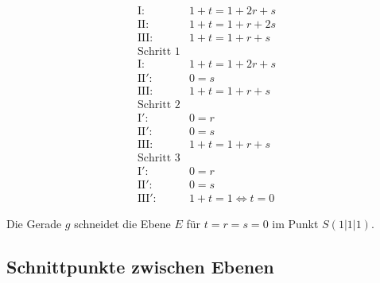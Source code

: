 \begin{flushleft}
\begin{align}
    \text{I}\colon& 1+t=1+2r+s \\
    \text{II}\colon& 1+t=1+r+2s \\
    \text{III}\colon& 1+t=1+r+s \\
    \text{Schritt 1}& \\
    \text{I}\colon& 1+t=1+2r+s \\
    \text{II}'\colon& 0=s \\
    \text{III}\colon& 1+t=1+r+s \\
    \text{Schritt 2}& \\
    \text{I}'\colon& 0=r \\
    \text{II}'\colon& 0=s \\
    \text{III}\colon& 1+t=1+r+s \\
    \text{Schritt 3}& \\
    \text{I}'\colon& 0=r \\
    \text{II}'\colon& 0=s \\
    \text{III}'\colon& 1+t=1 \Leftrightarrow t=0
\end{align}

Die Gerade $g$ schneidet die Ebene $E$ für $t=r=s=0$ im Punkt $S(1|1|1)$.
\end{flushleft}

\subsection{Schnittpunkte zwischen Ebenen}

